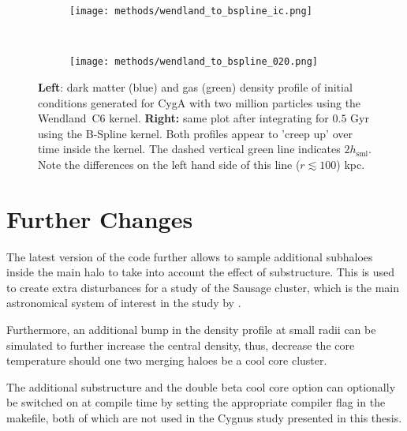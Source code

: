 \documentclass[MScProj_TLRH_ClusterEnergy.tex]{subfiles}
\begin{document}
\begin{figure}[ht]
  \centering
  \begin{subfigure}[b]{.5\textwidth}
    \centering
    \texttt{[image: methods/wendland\_to\_bspline\_ic.png]}
  \end{subfigure}%
  ~
  \begin{subfigure}[b]{.5\textwidth}
    \centering
    \texttt{[image: methods/wendland\_to\_bspline\_020.png]}
    \end{subfigure}
    \caption{\textbf{Left}: dark matter (blue) and gas (green) density profile
             of initial conditions generated for CygA with two million particles
             using the Wendland~C6 kernel. \textbf{Right:} same plot after 
             integrating for $0.5$ Gyr using the B-Spline kernel. Both profiles
             appear to 'creep up' over time inside the kernel. The dashed 
             vertical green line indicates $2h_{\text{sml}}$. Note the differences
             on the left hand side of this line ($r \lesssim 100$) kpc.}
    \label{fig:wendland_to_bspline}
\end{figure}








\section*{Further Changes}
The latest version of the code further allows to sample additional subhaloes inside
the main halo to take into account the effect of substructure. This is used 
to create extra disturbances for a study of the Sausage cluster, which is the main 
astronomical system of interest in the study by \citet{2016MNRAS.000.000D}.

Furthermore, an additional bump in the density profile at small radii can be
simulated to further increase the central density, thus, decrease the core 
temperature should one two merging haloes be a cool core cluster.

The additional substructure and the double beta cool core option can optionally 
be switched on at compile time by setting the appropriate compiler flag in the 
makefile, both of which are not used in the Cygnus study presented in this thesis.
\end{document}
